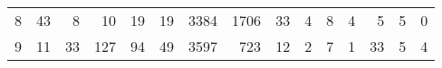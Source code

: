 \begin{tabular}{lrrrrrrrrrrrrrr}
8 &            43 &             8 &           10 &           19 &          19 &               3384 &              1706 &                            33 &                            4 &                8 &               4 &              5 &              5 &             0 \\
9 &            11 &            33 &          127 &           94 &          49 &               3597 &               723 &                            12 &                            2 &                7 &               1 &             33 &              5 &             4 \\
\bottomrule
\end{tabular}
